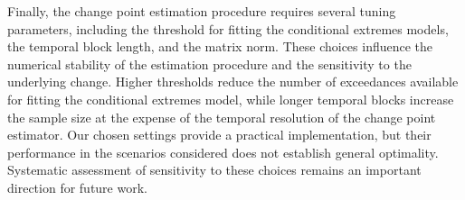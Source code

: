\documentclass[APA,STIX1COL]{WileyNJD-v2}
\begin{document}
Finally, the change point estimation procedure requires several tuning parameters, including the threshold for fitting the conditional extremes models, the temporal block length, and the matrix norm. These choices influence the numerical stability of the estimation procedure and the sensitivity to the underlying change. Higher thresholds reduce the number of exceedances available for fitting the conditional extremes model, while longer temporal blocks increase the sample size at the expense of the temporal resolution of the change point estimator. Our chosen settings provide a practical implementation, but their performance in the scenarios considered does not establish general optimality. Systematic assessment of sensitivity to these choices remains an important direction for future work.

\end{document}
